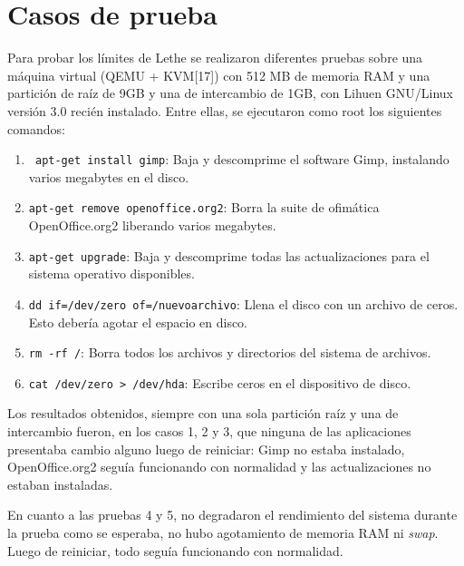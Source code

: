 \documentclass[final,narroweqnarray,inline,twoside]{ieee}
\newcommand{\itref}[1]{[{#1}]}
\begin{document}
\section{Casos de prueba}
Para probar los límites de Lethe se realizaron diferentes pruebas sobre una máquina virtual (QEMU + KVM\itref{17}) con 512 MB de memoria RAM y una partición de raíz de 9GB y una de intercambio de 1GB, con Lihuen GNU/Linux versión 3.0 recién instalado. Entre ellas, se ejecutaron como root los siguientes comandos:
\begin{enumerate}
 \item \texttt{ apt-get install gimp}:\newline
\hspace*{0.5cm} Baja y descomprime el software Gimp, instalando varios megabytes en el disco.
 \item \texttt{apt-get remove openoffice.org2}:\newline
\hspace*{0.5cm} Borra la suite de ofimática OpenOffice.org2 liberando varios megabytes.
 \item \texttt{apt-get upgrade}:\newline
\hspace*{0.5cm} Baja y descomprime todas las actualizaciones para el sistema operativo disponibles.
 \item \texttt{dd if=/dev/zero of=/nuevoarchivo}:\newline
\hspace*{0.5cm} Llena el disco con un archivo de ceros. Esto debería agotar el espacio en disco.
 \item \texttt{rm -rf /}:\newline
\hspace*{0.5cm} Borra todos los archivos y directorios del sistema de archivos.
 \item \texttt{cat /dev/zero > /dev/hda}:\newline
\hspace*{0.5cm} Escribe ceros en el dispositivo de disco.
\end{enumerate}

Los resultados obtenidos, siempre con una sola partición raíz y una de intercambio fueron, en los casos 1, 2 y 3, que ninguna de las aplicaciones presentaba cambio alguno luego de reiniciar: Gimp no estaba instalado, OpenOffice.org2 seguía funcionando con normalidad y las actualizaciones no estaban instaladas.

En cuanto a las pruebas 4 y 5, no degradaron el rendimiento del sistema durante la prueba como se esperaba, no hubo agotamiento de memoria RAM ni \textit{swap}. Luego de reiniciar, todo seguía funcionando con normalidad.
\end{document}
